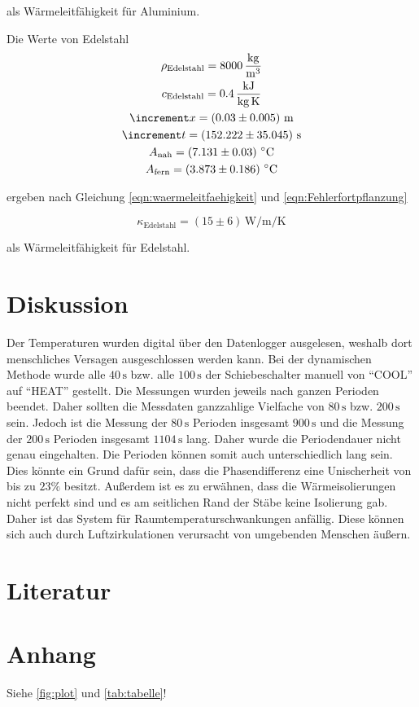 als Wärmeleitfähigkeit für Aluminium.
\hfill \break

Die Werte von Edelstahl
\begin{gather*}
  \rho_\text{Edelstahl} = 8000\,\unit[per-mode=fraction]{\kilo\gram\per\cubic\meter} \\
  c_\text{Edelstahl} = 0.4\,\unit{\kilo\joule\per\kilo\gram\per\kelvin} \\
  \increment x = \left(0.03\pm0.005\right)\,\unit{\meter} \\
  \increment t = \left(152.222\pm35.045\right)\,\unit{\second} \\
  A_\text{nah} = \left(7.131\pm0.03\right)\,\unit{\celsius}\\
  A_\text{fern} = \left(3.873\pm0.186\right)\,\unit{\celsius}\\
\end{gather*}

ergeben nach Gleichung \eqref{eqn:waermeleitfaehigkeit} und \eqref{eqn:Fehlerfortpflanzung}

\begin{equation}
  \kappa_\text{Edelstahl} = \left(15\pm6\right)\,\unit{\watt\per\meter\per\kelvin}
\end{equation}

als Wärmeleitfähigkeit für Edelstahl.
\hfill \break

\section{Diskussion}
Der Temperaturen wurden digital über den Datenlogger ausgelesen, weshalb dort menschliches Versagen ausgeschlossen werden kann.
Bei der dynamischen Methode wurde alle $40\,\unit{\second}$ bzw. alle $100\,\unit{\second}$ der Schiebeschalter manuell
von \enquote{COOL} auf \enquote{HEAT} gestellt. Die Messungen wurden jeweils nach ganzen Perioden beendet. Daher sollten die 
Messdaten ganzzahlige Vielfache von $80\,\unit{\second}$ bzw. $200\,\unit{\second}$ sein. Jedoch ist die Messung der 
$80\,\unit{\second}$ Perioden insgesamt $900\,\unit{\second}$ und die Messung der $200\,\unit{\second}$ Perioden insgesamt 
$1104\,\unit{\second}$ lang.
Daher wurde die Periodendauer nicht genau eingehalten. Die Perioden können somit auch unterschiedlich lang sein.
Dies könnte ein Grund dafür sein, dass die Phasendifferenz eine Unischerheit von bis zu $23{\%}$ besitzt.
Außerdem ist es zu erwähnen, dass die Wärmeisolierungen nicht perfekt sind und es am seitlichen Rand der Stäbe keine
Isolierung gab. Daher ist das System für Raumtemperaturschwankungen anfällig. Diese können sich auch durch Luftzirkulationen 
verursacht von umgebenden Menschen äußern. 

\section{Literatur}

\section{Anhang}
Siehe \autoref{fig:plot} und \autoref{tab:tabelle}!


